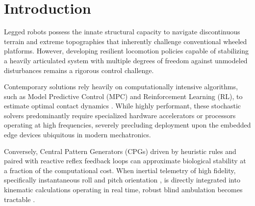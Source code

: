 \section{Introduction}

Legged robots possess the innate structural capacity to navigate
discontinuous terrain and extreme topographies that inherently
challenge conventional wheeled platforms.
However, developing resilient locomotion policies capable of
stabilizing a heavily articulated system with multiple degrees of
freedom against unmodeled disturbances remains a rigorous control
challenge.

Contemporary solutions rely heavily on computationally intensive
algorithms, such as Model Predictive Control (MPC) and
Reinforcement Learning (RL), to estimate optimal contact dynamics
\cite{gehring2013control, dicarlo2018dynamic}.
While highly performant, these stochastic solvers predominantly
require specialized hardware accelerators or processors operating
at high frequencies, severely
precluding deployment upon the embedded edge devices ubiquitous in
modern mechatronics.

Conversely, Central Pattern Generators (CPGs) driven by heuristic
rules and paired with reactive reflex feedback loops can approximate
biological stability at a fraction of the computational cost. When inertial telemetry of high fidelity,
specifically instantaneous roll and pitch orientation
\cite{madgwick2011estimation}, is directly integrated into kinematic
calculations operating in real time, robust blind ambulation
becomes tractable \cite{li2022posture}.

